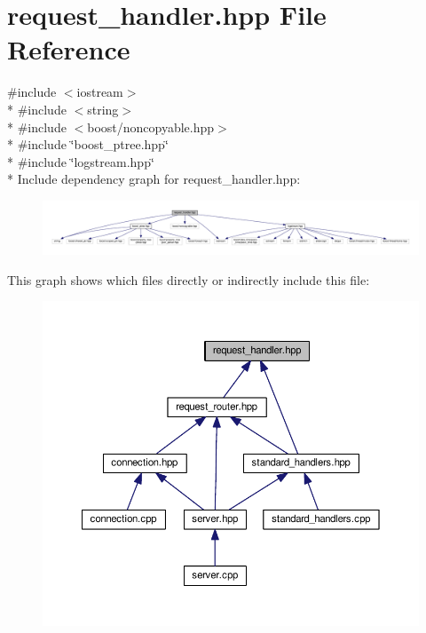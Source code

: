 \hypertarget{a00073}{\section{request\-\_\-handler.\-hpp File Reference}
\label{a00073}
}
{\ttfamily \#include $<$iostream$>$}\\*
{\ttfamily \#include $<$string$>$}\\*
{\ttfamily \#include $<$boost/noncopyable.\-hpp$>$}\\*
{\ttfamily \#include \char`\"{}boost\-\_\-ptree.\-hpp\char`\"{}}\\*
{\ttfamily \#include \char`\"{}logstream.\-hpp\char`\"{}}\\*
Include dependency graph for request\-\_\-handler.\-hpp\-:\nopagebreak
\begin{figure}[H]
\begin{center}
\leavevmode
\includegraphics[width=350pt]{a00116}
\end{center}
\end{figure}
This graph shows which files directly or indirectly include this file\-:\nopagebreak
\begin{figure}[H]
\begin{center}
\leavevmode
\includegraphics[width=350pt]{a00117}
\end{center}
\end{figure}
